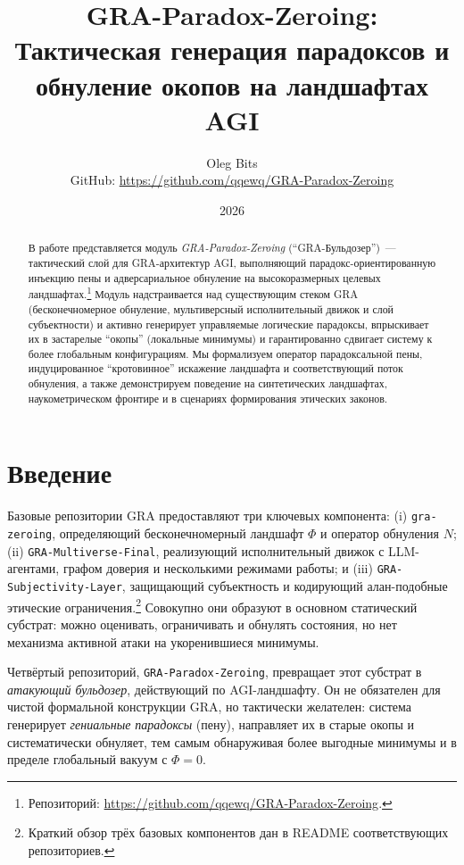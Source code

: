 \documentclass[11pt]{article}
\title{GRA-Paradox-Zeroing:\\
Тактическая генерация парадоксов и обнуление окопов на ландшафтах AGI}
\author{Oleg Bits\\
\small GitHub: \url{https://github.com/qqewq/GRA-Paradox-Zeroing}}
\date{2026}
\begin{document}
\maketitle

\begin{abstract}
В работе представляется модуль \emph{GRA-Paradox-Zeroing} (``GRA-Бульдозер'')~--- тактический слой для GRA-архитектур AGI, выполняющий парадокс-ориентированную инъекцию пены и адверсариальное обнуление на высокоразмерных целевых ландшафтах.\footnote{Репозиторий: \url{https://github.com/qqewq/GRA-Paradox-Zeroing}.} 
Модуль надстраивается над существующим стеком GRA (бесконечномерное обнуление, мультиверсный исполнительный движок и слой субъектности) и активно генерирует управляемые логические парадоксы, впрыскивает их в застарелые ``окопы'' (локальные минимумы) и гарантированно сдвигает систему к более глобальным конфигурациям. 
Мы формализуем оператор парадоксальной пены, индуцированное ``кротовинное'' искажение ландшафта и соответствующий поток обнуления, а также демонстрируем поведение на синтетических ландшафтах, наукометрическом фронтире и в сценариях формирования этических законов.
\end{abstract}

\section{Введение}

Базовые репозитории GRA предоставляют три ключевых компонента: (i) \texttt{gra-zeroing}, определяющий бесконечномерный ландшафт $\Phi$ и оператор обнуления $N$; (ii) \texttt{GRA-Multiverse-Final}, реализующий исполнительный движок с LLM-агентами, графом доверия и несколькими режимами работы; и (iii) \texttt{GRA-Subjectivity-Layer}, защищающий субъектность и кодирующий алан-подобные этические ограничения.\footnote{Краткий обзор трёх базовых компонентов дан в README соответствующих репозиториев.} 
Совокупно они образуют в основном статический субстрат: можно оценивать, ограничивать и обнулять состояния, но нет механизма активной атаки на укоренившиеся минимумы.

Четвёртый репозиторий, \texttt{GRA-Paradox-Zeroing}, превращает этот субстрат в \emph{атакующий бульдозер}, действующий по AGI-ландшафту. 
Он не обязателен для чистой формальной конструкции GRA, но тактически желателен: система генерирует \emph{гениальные парадоксы} (пену), направляет их в старые окопы и систематически обнуляет, тем самым обнаруживая более выгодные минимумы и в пределе глобальный вакуум с $\Phi = 0$.
\end{document}
